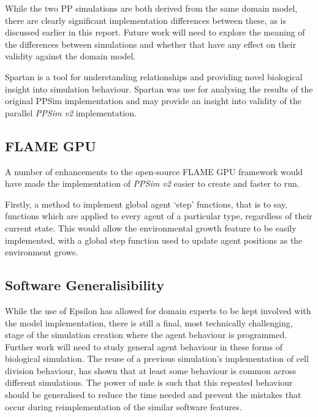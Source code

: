 \documentclass{UoYCSproject}
\begin{document}
While the two \gls{PP} simulations are both derived from the same domain model, there are clearly significant implementation differences between these, as is discussed earlier in this report.
Future work will need to explore the meaning of the differences between simulations and whether that have any effect on their validity against the domain model.

Spartan is a tool for understanding relationships and providing novel biological insight into simulation behaviour.
Spartan was use for analysing the results of the original PPSim implementation\cite{spartan} and may provide an insight into validity of the parallel \textit{PPSim v2} implementation.

\subsection{\gls{FLAME GPU}}
A number of enhancements to the open-source \gls{FLAME GPU} framework would have made the implementation of \textit{PPSim v2} easier to create and faster to run.

Firstly, a method to implement global agent `step' functions, that is to say, functions which are applied to every agent of a particular type, regardless of their current state.
This would allow the environmental growth feature to be easily implemented, with a global step function used to update agent positions as the environment grows.



\subsection{Software Generalisibility}%
While the use of Epsilon has allowed for domain experts to be kept involved with the model implementation, there is still a final, most technically challenging, stage of the simulation creation where the agent behaviour is programmed.
Further work will need to study general agent behaviour in these forms of biological simulation.
The reuse of a previous simulation's implementation of cell division behaviour, has shown that at least some behaviour is common across different simulations.
The power of \gls{mde} is such that this repeated behaviour should be generalised to reduce the time needed and prevent the mistakes that occur during reimplementation of the similar software features.
\end{document}
